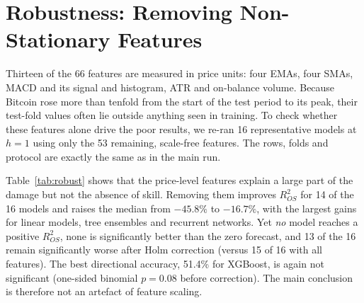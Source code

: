 \section{Robustness: Removing Non-Stationary Features}
\label{sec:robust}

Thirteen of the 66 features are measured in price units: four EMAs, four SMAs, MACD and its signal and histogram, ATR and on-balance volume. Because Bitcoin rose more than tenfold from the start of the test period to its peak, their test-fold values often lie outside anything seen in training. To check whether these features alone drive the poor results, we re-ran 16 representative models at $h=1$ using only the 53 remaining, scale-free features. The rows, folds and protocol are exactly the same as in the main run.

Table~\ref{tab:robust} shows that the price-level features explain a large part of the damage but not the absence of skill. Removing them improves $R^2_{OS}$ for 14 of the 16 models and raises the median from $-45.8\%$ to $-16.7\%$, with the largest gains for linear models, tree ensembles and recurrent networks. Yet \emph{no} model reaches a positive $R^2_{OS}$, none is significantly better than the zero forecast, and 13 of the 16 remain significantly worse after Holm correction (versus 15 of 16 with all features). The best directional accuracy, 51.4\% for XGBoost, is again not significant (one-sided binomial $p = 0.08$ before correction). The main conclusion is therefore not an artefact of feature scaling.


